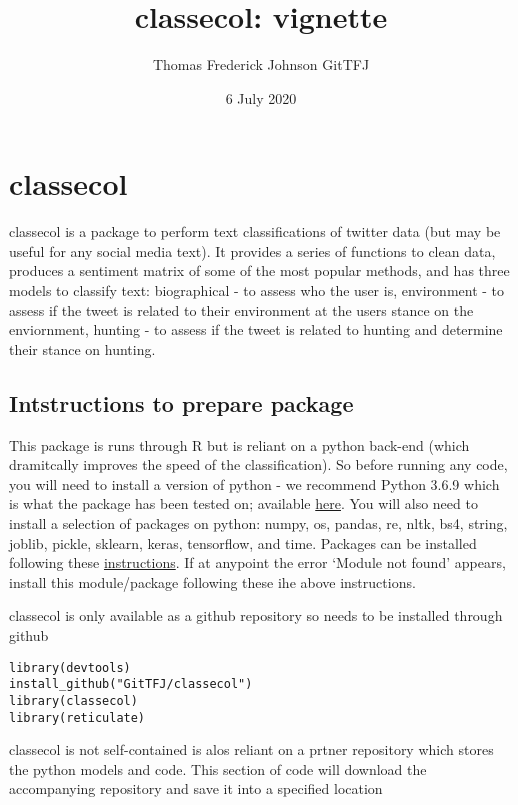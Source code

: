\documentclass[]{article}
\title{classecol: vignette}
\author{Thomas Frederick Johnson GitTFJ}
\date{6 July 2020}
\begin{document}
\maketitle

\section{classecol}\label{classecol}

classecol is a package to perform text classifications of twitter data
(but may be useful for any social media text). It provides a series of
functions to clean data, produces a sentiment matrix of some of the most
popular methods, and has three models to classify text: biographical -
to assess who the user is, environment - to assess if the tweet is
related to their environment at the users stance on the enviornment,
hunting - to assess if the tweet is related to hunting and determine
their stance on hunting.

\subsection{Intstructions to prepare
package}\label{intstructions-to-prepare-package}

This package is runs through R but is reliant on a python back-end
(which dramitcally improves the speed of the classification). So before
running any code, you will need to install a version of python - we
recommend Python 3.6.9 which is what the package has been tested on;
available
\href{https://www.python.org/downloads/release/python-369/}{here}. You
will also need to install a selection of packages on python: numpy, os,
pandas, re, nltk, bs4, string, joblib, pickle, sklearn, keras,
tensorflow, and time. Packages can be installed following these
\href{https://packaging.python.org/tutorials/installing-packages/}{instructions}.
If at anypoint the error `Module not found' appears, install this
module/package following these ihe above instructions.

classecol is only available as a github repository so needs to be
installed through github

\begin{verbatim}
library(devtools)
install_github("GitTFJ/classecol")
library(classecol)
library(reticulate)
\end{verbatim}

classecol is not self-contained is alos reliant on a prtner repository
which stores the python models and code. This section of code will
download the accompanying repository and save it into a specified
location
\end{document}
